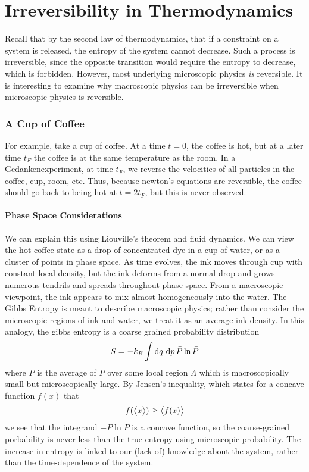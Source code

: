 \chapter{Irreversibility in Thermodynamics}
Recall that by the second law of thermodynamics, that if a constraint on a system is released, the entropy of the system cannot decrease. Such a process is irreversible, since the opposite transition would require the entropy to decrease, which is forbidden. However, most underlying microscopic physics \emph{is} reversible. It is interesting to examine why macroscopic physics can be irreversible when microscopic physics is reversible.

\subsection{A Cup of Coffee}
For example, take a cup of coffee. At a time \(t=0\), the coffee is hot, but at a later time \(t_F\) the coffee is at the same temperature as the room. In a Gedankenexperiment, at time \(t_F\), we reverse the velocities of all particles in the coffee, cup, room, etc. Thus, because newton's equations are reversible, the coffee should go back to being hot at \(t=2t_F\), but this is never observed. 

\subsubsection{Phase Space Considerations}
We can explain this using Liouville's theorem and fluid dynamics. We can view the hot coffee state as a drop of concentrated dye in a cup of water, or as a cluster of points in phase space. As time evolves, the ink moves through cup with constant local density, but the ink deforms from a normal drop and grows numerous tendrils and spreads throughout phase space. From a macroscopic viewpoint, the ink appears to mix almost homogeneously into the water. The Gibbs Entropy is meant to describe macroscopic physics; rather than consider the microscopic regions of ink and water, we treat it as an average ink density. In this analogy, the gibbs entropy is a coarse grained probability distribution
\[S = -k_B\int\d{q}\d{p}\bar{P}\ln \bar P\]
where \(\bar P\) is the average of \(P\) over some local region \(\Lambda\) which is macroscopically small but microscopically large. By Jensen's inequality, which states for a concave function \(f(x)\) that
\begin{equation}
	f(\left\langle \begin{matrix}x\end{matrix} \right\rangle) \geq \left\langle \begin{matrix}f(x)\end{matrix} \right\rangle
\end{equation}
we see that the integrand \(-P\ln P\) is a concave function, so the coarse-grained porbability is never less than the true entropy using microscopic probability. The increase in entropy is linked to our (lack of) knowledge about the system, rather than the time-dependence of the system.

